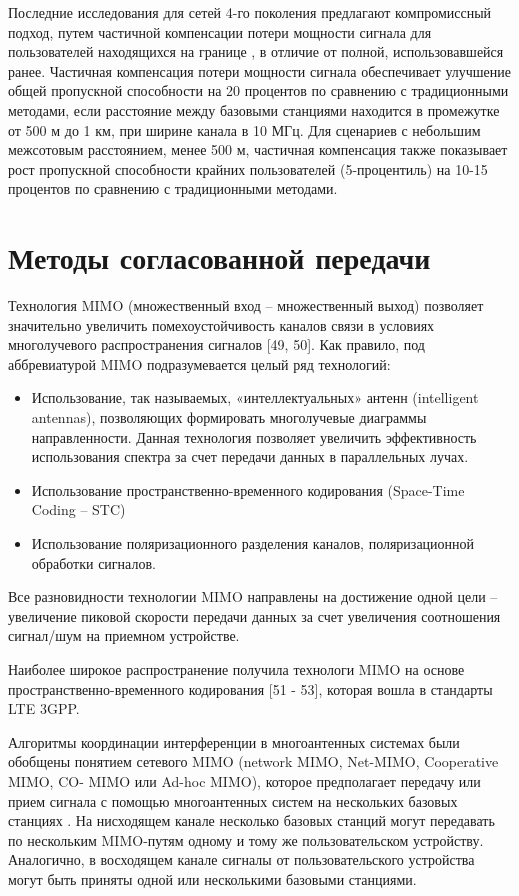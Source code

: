 Последние исследования для сетей 4-го поколения предлагают компромиссный подход, путем частичной компенсации потери мощности сигнала для пользователей находящихся на границе \cite{castellanos2008performance}, в отличие от полной, использовавшейся ранее. Частичная компенсация потери мощности сигнала обеспечивает улучшение общей пропускной способности на 20 процентов по сравнению с традиционными методами, если расстояние между базовыми станциями находится в промежутке от 500 м до 1 км, при ширине канала в 10 МГц. Для сценариев с небольшим межсотовым расстоянием, менее 500 м, частичная компенсация также показывает рост пропускной способности крайних пользователей (5-процентиль) на 10-15 процентов по сравнению с традиционными методами.

\section{Методы согласованной передачи} \label{sect4_2}
Технология MIMO (множественный вход – множественный выход) позволяет значительно увеличить помехоустойчивость каналов связи в условиях многолучевого распространения сигналов [49, 50]. Как правило, под аббревиатурой MIMO подразумевается целый ряд технологий:
\begin{itemize}
\item Использование, так называемых, «интеллектуальных» антенн (intelligent antennas), позволяющих формировать многолучевые диаграммы направленности. Данная технология позволяет увеличить эффективность использования спектра за счет передачи данных в параллельных лучах.
\item Использование пространственно-временного кодирования (Space-Time Coding – STC)
\item Использование поляризационного разделения каналов, поляризационной обработки сигналов.
\end{itemize}

Все разновидности технологии MIMO направлены на достижение одной цели – увеличение пиковой скорости передачи данных за счет увеличения соотношения сигнал/шум на приемном устройстве.

Наиболее широкое распространение получила технологи MIMO на основе пространственно-временного кодирования [51 - 53]\cite{oestges2010mimo,3GPPTS2530,3GPPTR25814}, которая вошла в стандарты LTE 3GPP.

Алгоритмы координации интерференции в многоантенных системах были обобщены понятием сетевого MIMO (network MIMO, Net-MIMO, Cooperative MIMO, CO- MIMO или Ad-hoc MIMO), которое предполагает передачу или прием сигнала с помощью многоантенных систем на нескольких базовых станциях \cite{jindal2006mimo}. На нисходящем канале несколько базовых станций могут передавать по нескольким MIMO-путям одному и тому же пользовательском устройству. Аналогично, в восходящем канале сигналы от пользовательского устройства могут быть приняты одной или несколькими базовыми станциями.

